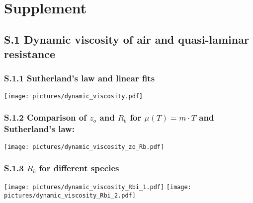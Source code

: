 \documentclass[manuscript]{copernicus}
\begin{document}
\clearpage
\setcounter{page}{1}

\section*{Supplement}
\subsection*{S.1 Dynamic viscosity of air and quasi-laminar resistance}
\subsubsection*{S.1.1 Sutherland's law and linear fits}
\appendixfigures
\begin{center}
  \texttt{[image: pictures/dynamic\_viscosity.pdf]}
\end{center}
\subsubsection*{S.1.2 Comparison of $z_o$ and $R_b$ for $\mu(T) = m\cdot T$ and Sutherland's law: }
\appendixfigures
\begin{center}
  \texttt{[image: pictures/dynamic\_viscosity\_zo\_Rb.pdf]}
\end{center}
\subsubsection*{S.1.3 $R_b$ for different species}
\appendixfigures
\begin{center}
  \texttt{[image: pictures/dynamic\_viscosity\_Rbi\_1.pdf]}
  \texttt{[image: pictures/dynamic\_viscosity\_Rbi\_2.pdf]}
\end{center}

\end{document}
